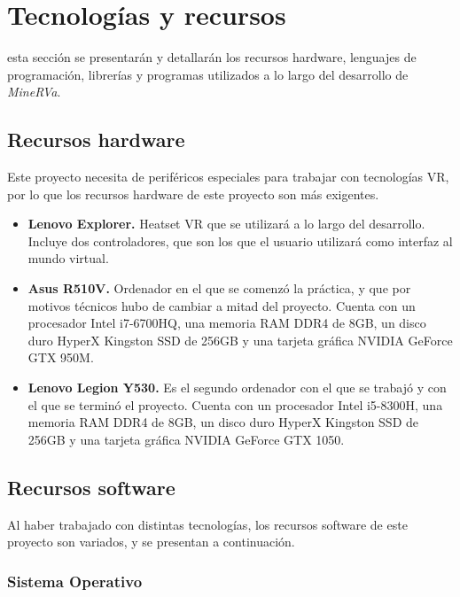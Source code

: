\chapter{Tecnologías y recursos}
\label{chap:tecnologia}

 esta sección se presentarán y detallarán los recursos hardware, lenguajes de programación, librerías y programas utilizados a lo largo del desarrollo de \textit{MineRVa}.

\section{Recursos hardware}

Este proyecto necesita de periféricos especiales para trabajar con tecnologías \acs{VR}, por lo que los recursos hardware de este proyecto son más exigentes.

\begin{itemize}
 \item \textbf{Lenovo Explorer.} Heatset \acs{VR} que se utilizará a lo largo del desarrollo. Incluye dos controladores, que son los que el usuario utilizará como interfaz al mundo virtual.

 \item \textbf{Asus R510V.} Ordenador en el que se comenzó la práctica, y que por motivos técnicos hubo de cambiar a mitad del proyecto. Cuenta con un procesador Intel i7-6700HQ, una memoria RAM DDR4 de 8GB, un disco duro HyperX Kingston SSD de 256GB y una tarjeta gráfica NVIDIA GeForce GTX 950M.
 
 \item \textbf{Lenovo Legion Y530.} Es el segundo ordenador con el que se trabajó y con el que se terminó el proyecto. Cuenta con un procesador Intel i5-8300H, una memoria RAM DDR4 de 8GB, un disco duro  HyperX Kingston SSD de 256GB y una tarjeta gráfica NVIDIA GeForce GTX 1050.
 
\end{itemize}

\section{Recursos software}

Al haber trabajado con distintas tecnologías, los recursos software de este proyecto son variados, y se presentan a continuación.

\subsection{Sistema Operativo}

